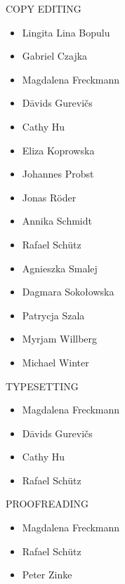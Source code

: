 COPY EDITING
\begin{itemize}
\item[]Lingita Lina Bopulu
\item[]Gabriel Czajka
\item[]Magdalena Freckmann
\item[]Dāvids Gurevičs
\item[]Cathy Hu
\item[]Eliza Koprowska
\item[]Johannes Probst
\item[]Jonas Röder
\item[]Annika Schmidt
\item[]Rafael Schütz
\item[]Agnieszka Smalej
\item[]Dagmara Sokołowska
\item[]Patrycja Szala
\item[]Myrjam Willberg
\item[]Michael Winter
\end{itemize}

TYPESETTING
\begin{itemize}
\item[]Magdalena Freckmann
\item[]Dāvids Gurevičs
\item[]Cathy Hu
\item[]Rafael Schütz
\end{itemize}

PROOFREADING
\begin{itemize}
\item[]Magdalena Freckmann
\item[]Rafael Schütz
\item[]Peter Zinke
\end{itemize}
